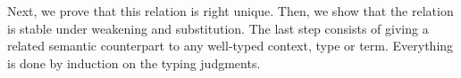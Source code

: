 Next, we prove that this relation is right unique.
Then, we show that the relation is stable under weakening and substitution.
  The last step consists of giving a related semantic counterpart to any
  well-typed context, type or term.
  Everything is done by induction on the typing judgments.
